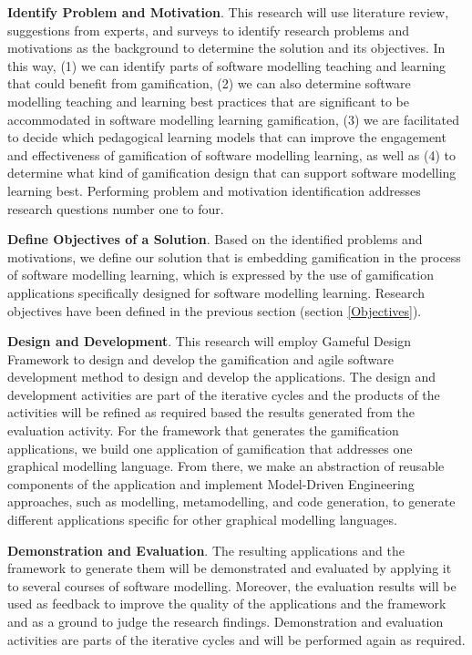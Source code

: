 \documentclass[12pt, a4paper]{report}
\begin{document}
{\textbf{Identify Problem and Motivation}. This research will use literature review, suggestions from experts, and surveys to identify research problems and motivations as the background to determine the solution and its objectives. In this way, (1) we can identify parts of software modelling teaching and learning that could benefit from gamification, (2) we can also determine software modelling teaching and learning best practices that are significant to be accommodated in software modelling learning gamification, (3) we are facilitated to decide which pedagogical learning models that can improve the engagement and effectiveness of gamification of software modelling learning, as well as (4) to determine what kind of gamification design that can support software modelling learning best. Performing problem and motivation identification addresses research questions number one to four.  

\textbf{Define Objectives of a Solution}. Based on the identified problems and motivations, we define our solution that is embedding gamification in the process of software modelling learning, which is expressed by the use of gamification applications specifically designed for software modelling learning. Research objectives have been defined in the previous section (section \ref{Objectives}).

\textbf{Design and Development}. This research will employ Gameful Design Framework \cite{deterding2015lens} to design and develop the gamification and agile software development method to design and develop the applications. The design and development activities are part of the iterative cycles and the products of the activities will be refined as required based the results generated from the evaluation activity. For the framework that generates the gamification applications, we build one application of gamification that addresses one graphical modelling language. From there, we make an abstraction of reusable components of the application and implement Model-Driven Engineering approaches, such as modelling, metamodelling, and code generation, to generate different applications specific for other graphical modelling languages.   

\textbf{Demonstration and Evaluation}. The resulting applications and the framework to generate them will be demonstrated and evaluated by applying it to several courses of software modelling. Moreover, the evaluation results will be used as feedback to improve the quality of the applications and the framework and as a ground to judge the research findings. Demonstration and evaluation activities are parts of the iterative cycles and will be performed again as required. 

}
\end{document}
